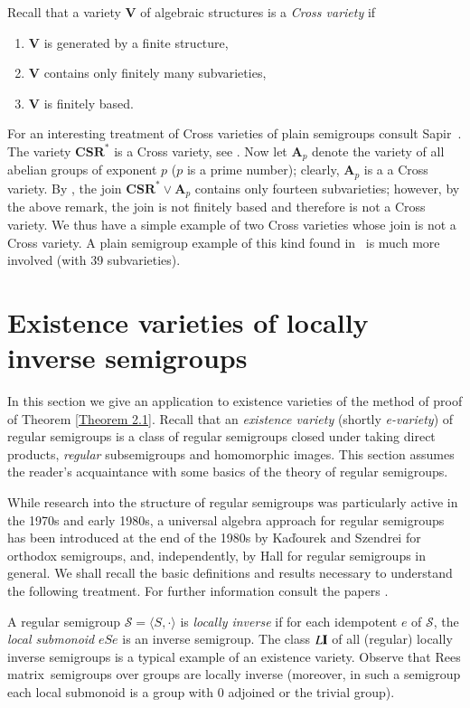 \documentclass[preprint,1p,times]{elsarticle}
\numberwithin{equation}{section}
\theoremstyle{remark}
\def\pv#1{{\bf #1}}
\def\Vc{\mathbf{V}}
\def\Rm{Rees matrix}
\begin{document}
Recall that a variety $\Vc$ of algebraic structures is a \emph{Cross variety} if
\renewcommand{\labelenumi}{\theenumi)}
\begin{enumerate}
\item $\Vc$ is generated by a finite structure,
\item $\Vc$ contains only finitely many subvarieties,
\item $\Vc$ is finitely based.
\end{enumerate}
For an interesting treatment of Cross varieties of plain semigroups consult Sapir~\cite{S}. The variety
$\mathbf{CSR^*}$ is a Cross variety, see \cite[Theorems 5.1 and 5.2, Corollary 5.4]{A1}. Now let $\mathbf{A}_p$ denote
the variety of all abelian groups of exponent $p$ ($p$ is a prime number); clearly, $\mathbf{A}_p$ is a a Cross
variety. By \cite[Corollaries 5.4 and 6.5]{A1}, the join $\mathbf{CSR^*}\vee\mathbf{A}_p$ contains only fourteen
subvarieties; however, by the above remark, the join is not finitely based and therefore is not a Cross variety. We
thus have a simple example of two Cross varieties whose join is not a Cross variety. A plain semigroup example of this
kind found in~\cite[Corollary 2.1]{S} is much more involved (with 39 subvarieties).

\section{Existence varieties of locally inverse semigroups}
In this section we give an application to existence varieties of the method of proof of Theorem \ref{Theorem 2.1}.
Recall that an \emph{existence variety} (shortly \emph{e-variety}) of regular semigroups is a class of regular
semigroups closed under taking direct products, \emph{regular} subsemigroups and homomorphic images. This section
assumes the reader's acquaintance with some basics of the theory of regular semigroups.

While research into the structure of regular semigroups was particularly active in the 1970s and early 1980s, a
universal algebra approach for regular semigroups has been introduced at the end of the 1980s by Ka\v{d}ourek and
Szendrei \cite{KS} for orthodox semigroups, and, independently, by Hall \cite{H1,H2} for regular semigroups in general.
We shall recall the basic definitions and results necessary to understand the following treatment. For further
information consult the papers \cite{KS,H1,H2,Y1,A2,A3}.

A regular semigroup $\mathcal{S}=\langle S,\cdot\rangle$ is \emph{locally inverse} if for each idempotent $e$ of
$\mathcal S$, the \emph{local submonoid} $eSe$ is an inverse semigroup. The class $L\pv I$ of all (regular) locally
inverse semigroups is a typical example of an existence variety. Observe that \Rm\ semigroups over groups are locally
inverse (moreover, in such a semigroup each local submonoid is a group with 0 adjoined or the trivial group).
\end{document}
